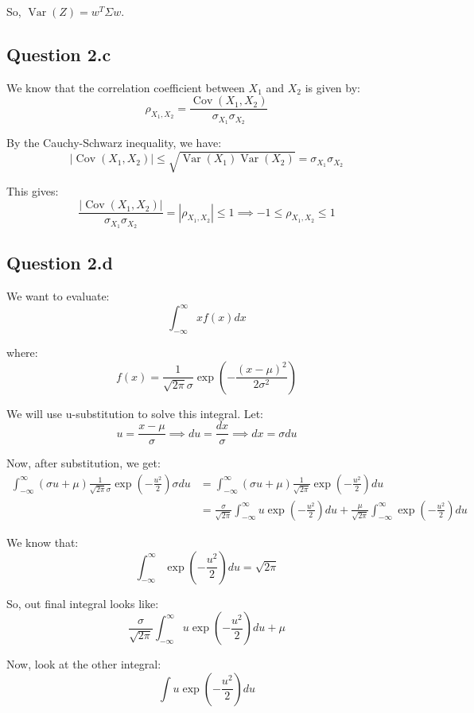 \documentclass[a4paper]{article}
\begin{document}
\noindent So, $\operatorname{Var}(Z) = w^T \Sigma w$.

\vspace{4mm}
\subsection*{Question 2.c}
We know that the correlation coefficient between $X_1$ and $X_2$ is given by:
\[
\rho_{X_1, X_2} = \frac{\operatorname{Cov}(X_1, X_2)}{\sigma_{X_1} \sigma_{X_2}}
\]

\noindent By the Cauchy-Schwarz inequality, we have:
\[
|\operatorname{Cov}(X_1, X_2)| \leq \sqrt{\operatorname{Var}(X_1) \operatorname{Var}(X_2)} = \sigma_{X_1} \sigma_{X_2}
\]

\noindent This gives:
\[
\frac{| \operatorname{Cov}(X_1, X_2) |}{\sigma_{X_1} \sigma_{X_2}} = |\rho_{X_1, X_2}| \leq 1 \implies -1 \leq \rho_{X_1, X_2} \leq 1
\]

\newpage
\subsection*{Question 2.d}
We want to evaluate:
\[
\int_{-\infty}^{\infty} x f(x) dx
\]

\noindent where:
\[
f(x) = \frac{1}{\sqrt{2\pi} \sigma} \exp\left(-\frac{(x - \mu)^2}{2\sigma^2}\right)
\]

\noindent We will use u-substitution to solve this integral. Let:
\[
u = \frac{x - \mu}{\sigma} \implies du = \frac{dx}{\sigma} \implies dx = \sigma du
\]

\noindent Now, after substitution, we get:
\begin{align*}
\int_{-\infty}^{\infty} (\sigma u + \mu) \frac{1}{\sqrt{2\pi} \sigma} \exp\left(-\frac{u^2}{2}\right) \sigma du &= \int_{-\infty}^{\infty} (\sigma u + \mu) \frac{1}{\sqrt{2\pi}} \exp\left(-\frac{u^2}{2}\right) du \\
&= \frac{\sigma}{\sqrt{2\pi}} \int_{-\infty}^{\infty} u \exp\left(-\frac{u^2}{2}\right) du + \frac{\mu}{\sqrt{2\pi}} \int_{-\infty}^{\infty} \exp\left(-\frac{u^2}{2}\right) du
\end{align*}


\noindent We know that:
\[
\int_{-\infty}^{\infty} \exp\left(-\frac{u^2}{2}\right) du = \sqrt{2\pi}
\]

\noindent So, out final integral looks like:
\[
\frac{\sigma}{\sqrt{2\pi}} \int_{-\infty}^{\infty} u \exp\left(-\frac{u^2}{2}\right) du + \mu
\]

\noindent Now, look at the other integral:
\[
\int u \exp\left(-\frac{u^2}{2}\right) du
\]
\end{document}
